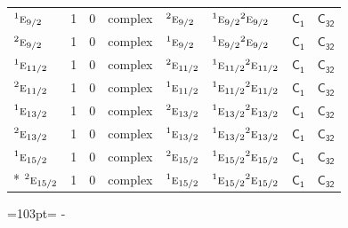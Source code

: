 \documentclass[10pt,a4paper]{article}
\newcommand{\needspace}[1]{\par\penalty-100\begingroup\dimen0=#1\relax\dimen2=\pagegoal
  \advance\dimen2-\pagetotal\ifdim\dimen0>\dimen2\relax\ifdim\dimen2>0pt\vfil\break\fi\fi
  \endgroup}
\numberwithin{equation}{section}
\newcommand{\grp}[1]{\mathsf{#1}}
\newcommand{\irr}[1]{\text{\normalfont\scshape #1}}
\newcommand{\conjpair}[1]{{}^{#1}}
\begin{document}
{\begin{longtable}{@{}lrrlllll@{}}
$\conjpair{1}\irr{e}_{9/2}$ & 1 & $0$ & complex & $\conjpair{2}\irr{e}_{9/2}$ & $\conjpair{1}\irr{e}_{9/2}\conjpair{2}\irr{e}_{9/2}$ & \href{C1.pdf}{$\grp{C_{1}}$} & $\grp{C_{32}}$\\
$\conjpair{2}\irr{e}_{9/2}$ & 1 & $0$ & complex & $\conjpair{1}\irr{e}_{9/2}$ & $\conjpair{1}\irr{e}_{9/2}\conjpair{2}\irr{e}_{9/2}$ & \href{C1.pdf}{$\grp{C_{1}}$} & $\grp{C_{32}}$\\
$\conjpair{1}\irr{e}_{11/2}$ & 1 & $0$ & complex & $\conjpair{2}\irr{e}_{11/2}$ & $\conjpair{1}\irr{e}_{11/2}\conjpair{2}\irr{e}_{11/2}$ & \href{C1.pdf}{$\grp{C_{1}}$} & $\grp{C_{32}}$\\
$\conjpair{2}\irr{e}_{11/2}$ & 1 & $0$ & complex & $\conjpair{1}\irr{e}_{11/2}$ & $\conjpair{1}\irr{e}_{11/2}\conjpair{2}\irr{e}_{11/2}$ & \href{C1.pdf}{$\grp{C_{1}}$} & $\grp{C_{32}}$\\
$\conjpair{1}\irr{e}_{13/2}$ & 1 & $0$ & complex & $\conjpair{2}\irr{e}_{13/2}$ & $\conjpair{1}\irr{e}_{13/2}\conjpair{2}\irr{e}_{13/2}$ & \href{C1.pdf}{$\grp{C_{1}}$} & $\grp{C_{32}}$\\
$\conjpair{2}\irr{e}_{13/2}$ & 1 & $0$ & complex & $\conjpair{1}\irr{e}_{13/2}$ & $\conjpair{1}\irr{e}_{13/2}\conjpair{2}\irr{e}_{13/2}$ & \href{C1.pdf}{$\grp{C_{1}}$} & $\grp{C_{32}}$\\
$\conjpair{1}\irr{e}_{15/2}$ & 1 & $0$ & complex & $\conjpair{2}\irr{e}_{15/2}$ & $\conjpair{1}\irr{e}_{15/2}\conjpair{2}\irr{e}_{15/2}$ & \href{C1.pdf}{$\grp{C_{1}}$} & $\grp{C_{32}}$\\*
$\conjpair{2}\irr{e}_{15/2}$ & 1 & $0$ & complex & $\conjpair{1}\irr{e}_{15/2}$ & $\conjpair{1}\irr{e}_{15/2}\conjpair{2}\irr{e}_{15/2}$ & \href{C1.pdf}{$\grp{C_{1}}$} & $\grp{C_{32}}$\\
\bottomrule\end{longtable}}
\needspace{103pt}
\end{document}
